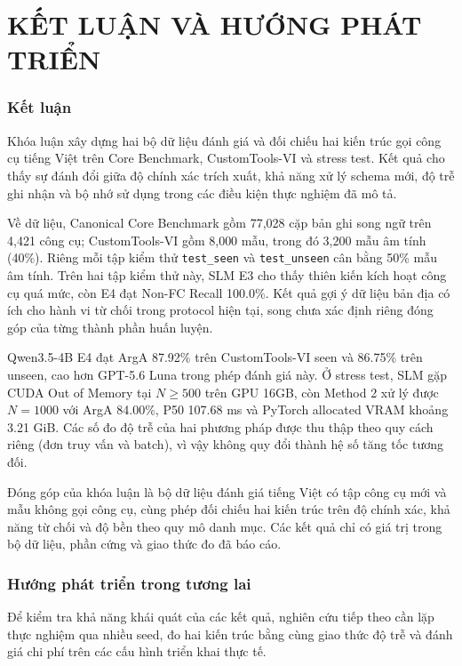 \chapter*{KẾT LUẬN VÀ HƯỚNG PHÁT TRIỂN}

\subsection{Kết luận}

Khóa luận xây dựng hai bộ dữ liệu đánh giá và đối chiếu hai kiến trúc gọi công cụ tiếng Việt trên Core Benchmark, CustomTools-VI và stress test. Kết quả cho thấy sự đánh đổi giữa độ chính xác trích xuất, khả năng xử lý schema mới, độ trễ ghi nhận và bộ nhớ sử dụng trong các điều kiện thực nghiệm đã mô tả.

Về dữ liệu, Canonical Core Benchmark gồm 77,028 cặp bản ghi song ngữ trên 4,421 công cụ; CustomTools-VI gồm 8,000 mẫu, trong đó 3,200 mẫu âm tính (40\%). Riêng mỗi tập kiểm thử \texttt{test_seen} và \texttt{test_unseen} cân bằng 50\% mẫu âm tính. Trên hai tập kiểm thử này, SLM E3 cho thấy thiên kiến kích hoạt công cụ quá mức, còn E4 đạt Non-FC Recall 100.0\%. Kết quả gợi ý dữ liệu bản địa có ích cho hành vi từ chối trong protocol hiện tại, song chưa xác định riêng đóng góp của từng thành phần huấn luyện.

Qwen3.5-4B E4 đạt ArgA 87.92\% trên CustomTools-VI seen và 86.75\% trên unseen, cao hơn GPT-5.6 Luna trong phép đánh giá này. Ở stress test, SLM gặp CUDA Out of Memory tại $N \ge 500$ trên GPU 16GB, còn Method 2 xử lý được $N=1000$ với ArgA 84.00\%, P50 107.68 ms và PyTorch allocated VRAM khoảng 3.21 GiB. Các số đo độ trễ của hai phương pháp được thu thập theo quy cách riêng (đơn truy vấn và batch), vì vậy không quy đổi thành hệ số tăng tốc tương đối.

Đóng góp của khóa luận là bộ dữ liệu đánh giá tiếng Việt có tập công cụ mới và mẫu không gọi công cụ, cùng phép đối chiếu hai kiến trúc trên độ chính xác, khả năng từ chối và độ bền theo quy mô danh mục. Các kết quả chỉ có giá trị trong bộ dữ liệu, phần cứng và giao thức đo đã báo cáo.

\subsection{Hướng phát triển trong tương lai}

Để kiểm tra khả năng khái quát của các kết quả, nghiên cứu tiếp theo cần lặp thực nghiệm qua nhiều seed, đo hai kiến trúc bằng cùng giao thức độ trễ và đánh giá chi phí trên các cấu hình triển khai thực tế.

